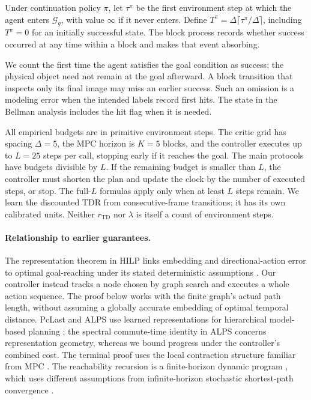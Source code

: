 \documentclass{article} %
\newcommand{\Htd}{r_{\mathrm{TD}}}
\theoremstyle{definition}
\theoremstyle{remark}
\begin{document}
\begin{definition}
Under continuation policy $\pi$, let $\tau^\pi$ be the first environment step at which
the agent enters $\mathcal G_g$, with value $\infty$ if it never enters. Define
$T^\pi=\Delta\lceil\tau^\pi/\Delta\rceil$, including $T^\pi=0$ for an initially
successful state. The block process records whether success occurred at any time within
a block and makes that event absorbing.
\end{definition}
We count the first time the agent satisfies the goal condition as success; the
physical object need not remain at the goal afterward.
A block transition that inspects only its final image may miss an earlier success.
Such an omission is a modeling error when the intended labels record first hits.
The state in the Bellman analysis includes the hit flag when it is needed.

All empirical budgets are in primitive environment steps. The critic grid has spacing
$\Delta=5$, the MPC horizon is $K=5$ blocks, and the controller executes up to $L=25$
steps per call, stopping early if it reaches the goal.
The main protocols have budgets divisible by $L$. If the remaining budget is smaller
than $L$, the controller must shorten the plan and update the clock by the number of
executed steps, or stop. The full-$L$ formulas apply only when at least $L$ steps remain.
We learn the discounted TDR from consecutive-frame transitions; it has its own
calibrated units. Neither $\Htd$ nor $\lambda$ is itself a count of environment steps.

\paragraph{Relationship to earlier guarantees.}
The representation theorem in HILP links embedding and directional-action error to
optimal goal-reaching under its stated deterministic assumptions \citep{hilp}.
Our controller instead tracks a node chosen by graph search and executes a whole action
sequence. The proof below works with the finite graph's actual path length, without
assuming a globally accurate embedding of optimal temporal distance.
PcLast and ALPS use learned representations for hierarchical model-based planning
\citep{pclast,alps}; the spectral commute-time identity in ALPS concerns representation
geometry, whereas we bound progress under the controller's combined cost.
The terminal proof uses the local contraction structure familiar from MPC
\citep{mayne2000}. The reachability recursion is a finite-horizon dynamic program
\citep{abate2008},
which uses different assumptions from infinite-horizon stochastic shortest-path convergence
\citep{bertsekas1991}.
\end{document}

